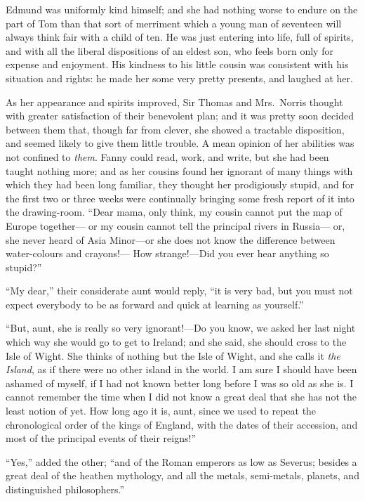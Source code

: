 \documentclass{article}
\begin{document}
Edmund was uniformly kind himself; and she had nothing
worse to endure on the part of Tom than that sort
of merriment which a young man of seventeen will always
think fair with a child of ten.  He was just entering
into life, full of spirits, and with all the liberal
dispositions of an eldest son, who feels born only
for expense and enjoyment.  His kindness to his little
cousin was consistent with his situation and rights:
he made her some very pretty presents, and laughed at her.

As her appearance and spirits improved, Sir Thomas and Mrs.\ Norris
thought with greater satisfaction of their benevolent plan;
and it was pretty soon decided between them that,
though far from clever, she showed a tractable disposition,
and seemed likely to give them little trouble.  A mean
opinion of her abilities was not confined to \emph{them}.
Fanny could read, work, and write, but she had been taught
nothing more; and as her cousins found her ignorant
of many things with which they had been long familiar,
they thought her prodigiously stupid, and for the first
two or three weeks were continually bringing some fresh
report of it into the drawing-room. ``Dear mama, only think,
my cousin cannot put the map of Europe together---%
or my cousin cannot tell the principal rivers in Russia---%
or, she never heard of Asia Minor---or she does not know
the difference between water-colours and crayons!---%
How strange!---Did you ever hear anything so stupid?''

``My dear,'' their considerate aunt would reply,
``it is very bad, but you must not expect everybody
to be as forward and quick at learning as yourself.''

``But, aunt, she is really so very ignorant!---Do you know,
we asked her last night which way she would go to get
to Ireland; and she said, she should cross to the Isle
of Wight.  She thinks of nothing but the Isle of Wight,
and she calls it \emph{the Island}, as if there were no
other island in the world.  I am sure I should have been
ashamed of myself, if I had not known better long before I
was so old as she is.  I cannot remember the time when I
did not know a great deal that she has not the least
notion of yet.  How long ago it is, aunt, since we used
to repeat the chronological order of the kings of England,
with the dates of their accession, and most of the principal
events of their reigns!''

``Yes,'' added the other; ``and of the Roman emperors
as low as Severus; besides a great deal of the heathen
mythology, and all the metals, semi-metals, planets,
and distinguished philosophers.''
\end{document}
